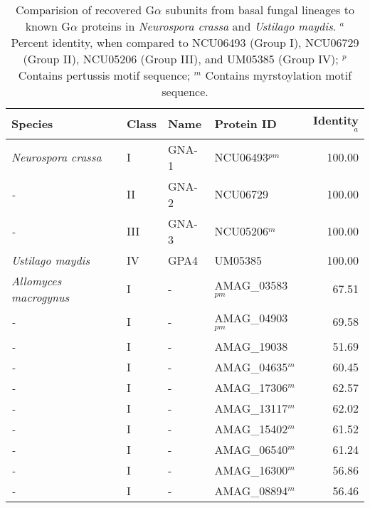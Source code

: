 
{\renewcommand{\arraystretch}{0.5} %
{\footnotesize %
\begin{longtable}{llllr}
\caption[G$\alpha$ subunit comparison]{Comparision of recovered G$\alpha$ subunits from basal fungal lineages to known G$\alpha$ proteins in \textit{Neurospora crassa} and \textit{Ustilago maydis}. $^{a}$ Percent identity, when compared to NCU06493 (Group I), NCU06729 (Group II), NCU05206 (Group III), and UM05385 (Group IV); $^{p}$ Contains pertussis motif sequence; $^{m}$ Contains myrstoylation motif sequence.} \label{tab:ChRhodA_GAcomp} \\
  \hline
Species & Class & Name & Protein ID & Identity$^{a}$ \\ 
  \hline
\emph{Neurospora crassa } & I & GNA-1 & NCU06493$^{pm}$ & 100.00 \\ 
  \emph{-} & II & GNA-2 & NCU06729 & 100.00 \\ 
  \emph{-} & III & GNA-3 & NCU05206$^{m}$ & 100.00 \\ 
  \emph{Ustilago maydis} & IV & GPA4 & UM05385 & 100.00 \\ 
  \emph{Allomyces macrogynus} & I & - & AMAG\_03583$^{pm}$ & 67.51 \\ 
  \emph{-} & I & - & AMAG\_04903$^{pm}$ & 69.58 \\ 
  \emph{-} & I & - & AMAG\_19038 & 51.69 \\ 
  \emph{-} & I & - & AMAG\_04635$^{m}$ & 60.45 \\ 
  \emph{-} & I & - & AMAG\_17306$^{m}$ & 62.57 \\ 
  \emph{-} & I & - & AMAG\_13117$^{m}$ & 62.02 \\ 
  \emph{-} & I & - & AMAG\_15402$^{m}$ & 61.52 \\ 
  \emph{-} & I & - & AMAG\_06540$^{m}$ & 61.24 \\ 
  \emph{-} & I & - & AMAG\_16300$^{m}$ & 56.86 \\ 
  \emph{-} & I & - & AMAG\_08894$^{m}$ & 56.46 \\ 

\end{longtable}}}
